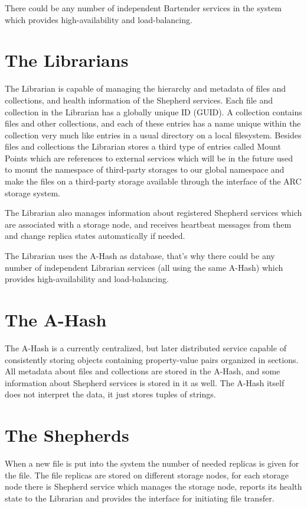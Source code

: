\documentclass{book}
\begin{document}
There could be any number of independent Bartender services in the system which provides high-availability and load-balancing.


\section{The Librarians} %
\label{sec:the_librarians}
The Librarian is capable of managing the hierarchy and metadata of files and collections, and health information of the Shepherd services. Each file and collection in the Librarian has a globally unique ID (GUID). A collection contains files and other collections, and each of these entries has a name unique within the collection very much like entries in a usual directory on a local filesystem. Besides files and collections the Librarian stores a third type of entries called Mount Points which are references to external services which will be in the future used to mount the namespace of third-party storages to our global namespace and make the files on a third-party storage available through the interface of the ARC storage system.

The Librarian also manages information about registered Shepherd services which are associated with a storage node, and receives heartbeat messages from them and change replica states automatically if needed.

The Librarian uses the A-Hash as database, that’s why there could be any number of independent Librarian services (all using the same A-Hash) which provides high-availability and load-balancing.


\section{The A-Hash} %
\label{sec:the_a_hash}
The A-Hash is a currently centralized, but later distributed service capable of consistently storing objects containing property-value pairs organized in sections. All metadata about files and collections are stored in the A-Hash, and some information about Shepherd services is stored in it as well. The A-Hash itself does not interpret the data, it just stores tuples of strings.


\section{The Shepherds} %
\label{sec:the_shepherds}
When a new file is put into the system the number of needed replicas is given for the file. The file replicas are stored on different storage nodes, for each storage node there is Shepherd service which manages the storage node, reports its health state to the Librarian and provides the interface for initiating file transfer.
\end{document}
